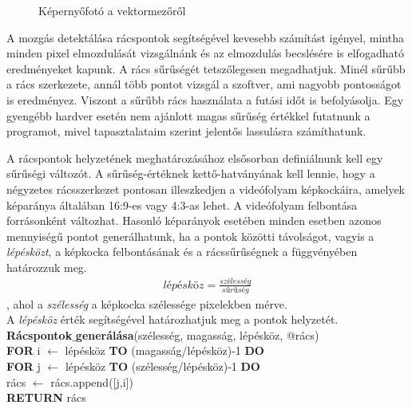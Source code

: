 \begin{figure}[h]
\centering
{}
\caption{Képernyőfotó a vektormezőről}
\label{fig:vectorfield}
\end{figure}

A mozgás detektálása rácspontok segítségével kevesebb számítást igényel, mintha minden pixel elmozdulását vizsgálnánk és az elmozdulás becslésére is elfogadható eredményeket kapunk.
A rács sűrűségét tetszőlegesen megadhatjuk. Minél sűrűbb a rács szerkezete, annál több pontot vizsgál a szoftver, ami nagyobb pontosságot is eredményez. Viszont a sűrűbb rács használata a futási időt is befolyásolja. Egy gyengébb hardver esetén nem ajánlott magas sűrűség értékkel futatnunk a programot, mivel tapasztalataim szerint jelentős lassulásra számíthatunk.

A rácspontok helyzetének meghatározásához elsősorban definiálnunk kell egy sűrűségi változót. A sűrűség-értéknek kettő-hatványának kell lennie, hogy a négyzetes rácsszerkezet pontosan illeszkedjen a videófolyam képkockáira, amelyek képaránya általában 16:9-es vagy 4:3-as lehet. A videófolyam felbontása forrásonként változhat. Hasonló képarányok esetében minden esetben azonos mennyiségű pontot generálhatunk, ha a pontok közötti távolságot, vagyis a \textit{lépésközt}, a képkocka felbontásának és a rácssűrűségnek a függvényében határozzuk meg.
\begin{align*}
\textit{lépésköz} = \frac{\textit{szélesség}}{\textit{sűrűség}}
\end{align*}
, ahol a \textit{szélesség} a képkocka szélessége pixelekben mérve.\\
A \textit{lépésköz} érték segítségével határozhatjuk meg a pontok helyzetét.\\
\newline
\noindent \textbf{Rácspontok$\_$generálása}(szélesség, magasság, lépésköz, @rács)\\ 
\textbf{FOR} i $\leftarrow$ lépésköz \textbf{TO} (magasság/lépésköz)-1 \textbf{DO}\\
\indent \textbf{FOR} j $\leftarrow$ lépésköz \textbf{TO} (szélesség/lépésköz)-1 \textbf{DO}\\
\indent \indent rács $\leftarrow$ rács.append([j,i])\\
\textbf{RETURN} rács

